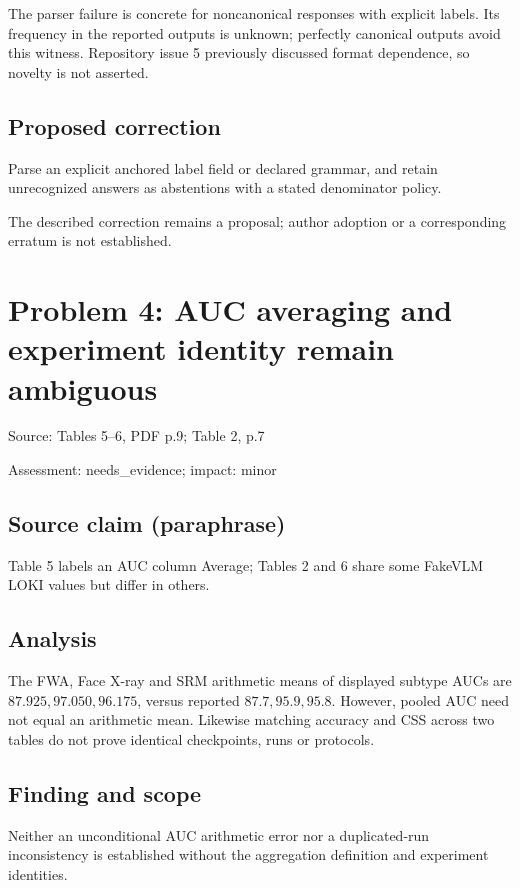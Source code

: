 \documentclass[11pt]{article}
\begin{document}
The parser failure is concrete for noncanonical responses with explicit labels. Its frequency in the reported outputs is unknown; perfectly canonical outputs avoid this witness. Repository issue 5 previously discussed format dependence, so novelty is not asserted.

\subsection*{Proposed correction}

Parse an explicit anchored label field or declared grammar, and retain unrecognized answers as abstentions with a stated denominator policy.

The described correction remains a proposal; author adoption or a corresponding erratum is not established.

\section*{Problem 4: AUC averaging and experiment identity remain ambiguous}

Source: Tables 5–6, PDF p.9; Table 2, p.7

Assessment: needs\_evidence; impact: minor

\subsection*{Source claim (paraphrase)}

Table 5 labels an AUC column Average; Tables 2 and 6 share some FakeVLM LOKI values but differ in others.

\subsection*{Analysis}

The FWA, Face X-ray and SRM arithmetic means of displayed subtype AUCs are \(87.925,97.050,96.175\), versus reported \(87.7,95.9,95.8\). However, pooled AUC need not equal an arithmetic mean. Likewise matching accuracy and CSS across two tables do not prove identical checkpoints, runs or protocols.

\subsection*{Finding and scope}

Neither an unconditional AUC arithmetic error nor a duplicated-run inconsistency is established without the aggregation definition and experiment identities.
\end{document}
